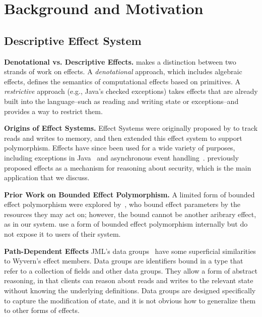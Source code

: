\chapter{Background and Motivation}

\section{Descriptive Effect System}

\noindent\textbf{Denotational vs. Descriptive Effects.}  \citet{filinski10} makes a distinction between two strands of work on effects. A \textit{denotational} approach, which includes algebraic effects, defines the semantics of computational effects based on primitives.  A \textit{restrictive} approach (e.g., Java's checked exceptions) takes effects that are already built into the language--such as reading and writing state or exceptions--and provides a way to restrict them. 


\noindent\textbf{Origins of Effect Systems.}  Effect Systems were originally proposed by \citet{lucassen87} to track reads and writes to memory, and then \citet{lucassen88} extended this effect system to support polymorphism.  Effects have since been used for a wide variety of purposes, including exceptions in Java~\cite{kiniry06} and asynchronous event handling~\cite{bracevac18}. \citet{turbak08} previously proposed effects as a mechanism for reasoning about security, which is the main application that we discuss.


\noindent\textbf{Prior Work on Bounded Effect Polymorphism.}  A limited form of bounded effect polymorphism were explored by~\citet{10.5555/645393.651891}, who bound effect parameters by the resources they may act on; however, the bound cannot be another aribrary effect, as in our system.  \citet{DBLP:conf/ecoop/LongLR15} use a form of bounded effect polymorphism internally but do not expose it to users of their system.

\noindent\textbf{Path-Dependent Effects}
JML's data groups~\cite{leino02} have some superficial similarities to Wyvern's effect members.  Data groups are identifiers bound in a type that refer to a collection of fields and other data groups.  They allow a form of abstract reasoning, in that clients can reason about reads and writes to the relevant state without knowing the underlying definitions.  Data groups are designed specifically to capture the modification of state, and it is not obvious how to generalize them to other forms of effects.

